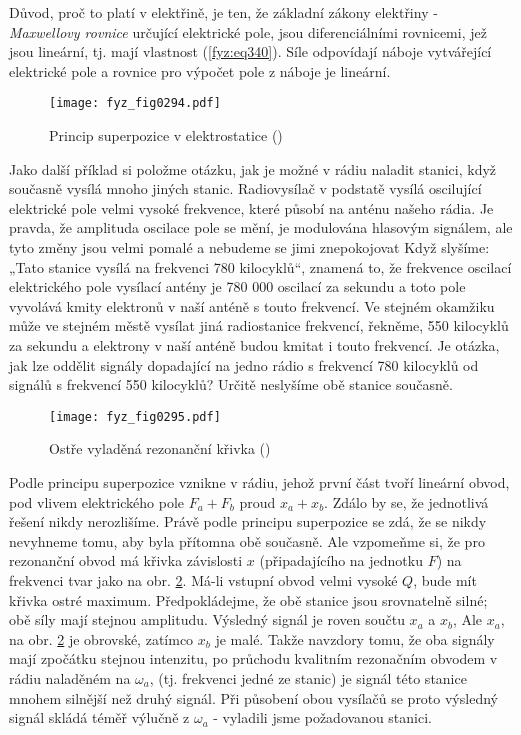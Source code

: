     Důvod, proč to platí v elektřině, je ten, že základní zákony elektřiny - \emph{Maxwellovy 
    rovnice} určující elektrické pole, jsou diferenciálními rovnicemi, jež jsou lineární, tj. mají 
    vlastnost (\ref{fyz:eq340}). Síle odpovídají náboje vytvářející elektrické pole a rovnice pro 
    výpočet pole z náboje je lineární. 

    \begin{figure}[ht!] %
      \centering
      \texttt{[image: fyz\_fig0294.pdf]}
      \caption{Princip superpozice v elektrostatice
               (\cite[s.~335]{Feynman01})}
      \label{fyz:fig0294}
    \end{figure}
    
    Jako další příklad si položme otázku, jak je možné v rádiu naladit stanici, když současně 
    vysílá mnoho jiných stanic. Radiovysílač v podstatě vysílá oscilující elektrické pole velmi 
    vysoké frekvence, které působí na anténu našeho rádia. Je pravda, že amplituda oscilace pole se 
    mění, je modulována hlasovým signálem, ale tyto změny jsou velmi pomalé a nebudeme se jimi 
    znepokojovat Když slyšíme: „Tato stanice vysílá na frekvenci 780 kilocyklů“, znamená to, že 
    frekvence oscilací elektrického pole vysílací antény je 780 000 oscilací za sekundu a toto pole 
    vyvolává kmity elektronů v naší anténě s touto frekvencí. Ve stejném okamžiku může ve stejném 
    městě vysílat jiná radiostanice frekvencí, řekněme, 550 kilocyklů za sekundu a elektrony v naší 
    anténě budou kmitat i touto frekvencí. Je otázka, jak lze oddělit signály dopadající na jedno 
    rádio s frekvencí 780 kilocyklů od signálů s frekvencí 550 kilocyklů? Určitě neslyšíme obě 
    stanice současně. 
    
    \begin{figure}[ht!] %
      \centering
      \texttt{[image: fyz\_fig0295.pdf]}
      \caption{Ostře vyladěná rezonanční křivka
               (\cite[s.~335]{Feynman01})}
      \label{fyz:fig0295}
    \end{figure}
    
    Podle principu superpozice vznikne v rádiu, jehož první část tvoří lineární obvod, pod vlivem 
    elektrického pole \(F_a + F_b\) proud \(x_a + x_b\). Zdálo by se, že jednotlivá řešení nikdy 
    nerozlišíme. Právě podle principu superpozice se zdá, že se nikdy nevyhneme tomu, aby byla 
    přítomna obě současně. Ale vzpomeňme si, že pro rezonanční obvod má křivka závislosti \(x\) 
    (připadajícího na jednotku \(F\)) na frekvenci tvar jako na obr. \ref{fyz:fig0295}. Má-li 
    vstupní obvod velmi vysoké \(Q\), bude mít křivka ostré maximum. Předpokládejme, že obě stanice 
    jsou srovnatelně silné; obě síly mají stejnou amplitudu. Výsledný signál je roven součtu 
    \(x_a\) a \(x_b\), Ale \(x_a\), na obr. \ref{fyz:fig0295} je obrovské, zatímco \(x_b\) je malé. 
    Takže navzdory tomu, že oba signály mají zpočátku stejnou intenzitu, po průchodu kvalitním 
    rezonačním obvodem v rádiu naladěném na \(\omega_a\), (tj. frekvenci jedné ze stanic) je signál 
    této stanice mnohem silnější než druhý signál. Při působení obou vysílačů se proto výsledný 
    signál skládá téměř výlučně z \(\omega_a\) - vyladili jsme požadovanou stanici.
    
